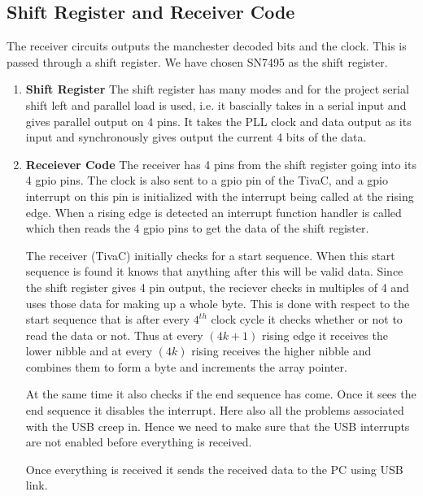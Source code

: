 \documentclass{article}
\begin{document}
\subsection{Shift Register and Receiver Code}
The receiver circuits outputs the manchester decoded bits and the clock. This is passed through a shift register. We have chosen SN7495 as the shift register. 
\begin{enumerate}
\item \textbf{Shift Register}
  The shift register has many modes and for the project serial shift left and parallel load is used, i.e. it bascially takes in a serial input and gives parallel output on 4 pins. It takes the PLL clock and data output as its input and synchronously gives output the current 4 bits of the data.
\item \textbf{Receiever Code}
  The receiver has 4 pins from the shift register going into its 4 gpio pins. The clock is also sent to a gpio pin of the TivaC, and a gpio interrupt on this pin is initialized with the interrupt being called at the rising edge. When a rising edge is detected an interrupt function handler is called which then reads the 4 gpio pins to get the data of the shift register. 
  
  The receiver (TivaC) initially checks for a start sequence. When this start sequence is found it knows that anything after this will be valid data. Since the shift register gives 4 pin output, the reciever checks in multiples of 4 and uses those data for making up a whole byte. This is done with respect to the start sequence that is after every $4^{th}$ clock cycle it checks whether or not to read the data or not. Thus at every $(4k+1)$ rising edge it receives the lower nibble and at every $(4k)$ rising receives the higher nibble and combines them to form a byte and increments the array pointer.  

  At the same time it also checks if the end sequence has come. Once it sees the end sequence it disables the interrupt. Here also all the problems associated with the USB creep in. Hence we need to make sure that the USB interrupts are not enabled before everything is received.

  Once everything is received it sends the received data to the PC using USB link.
\end{enumerate}
\end{document}
